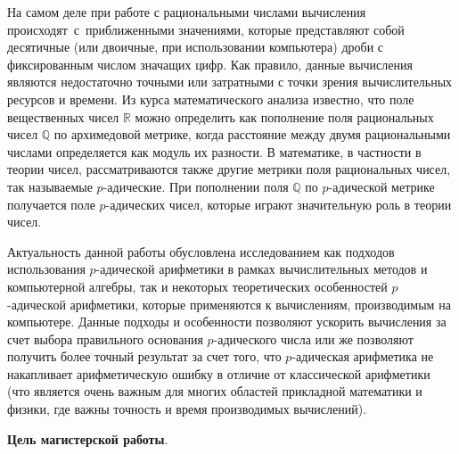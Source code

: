 \documentclass[master, och, autoref, times]{sty/SCWorks}
\theoremstyle{plain}
\theoremstyle{definition}
\numberwithin{equation}{section}
\begin{document}
На самом деле при работе с рациональными числами вычисления \mbox{происходят с приближенными} значениями, которые представляют собой \mbox{десятичные} (или двоичные, при использовании компьютера) дроби с \mbox{фиксированным} числом значащих цифр.  Как правило, данные вычисления являются недостаточно точными или затратными с точки зрения \mbox{вычислительных} ресурсов и времени.
Из курса математического анализа \mbox{известно}, что поле вещественных чисел $\mathbb{R}$ можно определить как \mbox{пополнение} поля рациональных чисел $\mathbb{Q}$ по архимедовой метрике, когда расстояние \mbox{между} двумя рациональными числами определяется как модуль их \mbox{разности}. В математике, в частности в теории чисел, рассматриваются также \mbox{другие} метрики поля рациональных чисел, так называемые $p$-адические. При \mbox{пополнении} поля $\mathbb{Q}$ по $p$-адической метрике получается поле $p$-адических \mbox{чисел}, которые играют значительную роль в теории чисел.

Актуальность данной работы обусловлена исследованием как \mbox{подходов} использования $p$-адической арифметики в рамках вычислительных \mbox{методов} и компьютерной алгебры, так и некоторых теоретических \mbox{особенностей} \mbox{$p$-адической} арифметики, которые применяются к вычислениям, \mbox{производимым} на компьютере. Данные подходы и особенности позволяют ускорить \mbox{вычисления} за счет выбора правильного основания $p$-адического числа или же  позволяют получить более точный результат за счет того, что $p$-адическая арифметика не накапливает арифметическую ошибку в отличие от классической арифметики (что является очень важным для многих областей прикладной математики и физики, где важны точность и время производимых вычислений).


\textbf{Цель магистерской работы}.
\end{document}

